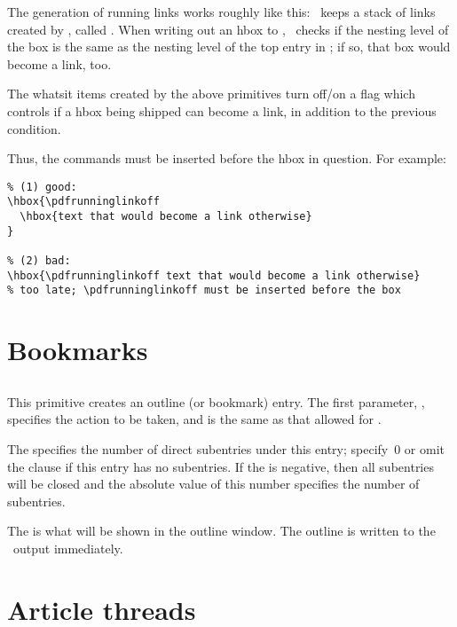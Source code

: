 \documentclass{pdftexmanual}
\begin{document}
The generation of running links works roughly like this: \PDFTEX\ keeps
a stack of links created by , called
. When writing out an hbox to \PDF, \PDFTEX\ checks
if the nesting level of the box is the same as the nesting level of the
top entry in ; if so, that box would become a link,
too.

The whatsit items created by the above primitives turn off/on a flag
which controls if a hbox being shipped can become a link, in addition to
the previous condition.

Thus, the commands must be inserted before the hbox in question. For example:

\begin{verbatim}
% (1) good:
\hbox{\pdfrunninglinkoff
  \hbox{text that would become a link otherwise}
}

% (2) bad:
\hbox{\pdfrunninglinkoff text that would become a link otherwise} 
% too late; \pdfrunninglinkoff must be inserted before the box
\end{verbatim}

\section{Bookmarks}

\subsection{}

This primitive creates an outline (or bookmark) entry. The first
parameter, , specifies the action to be taken, and
is the same as that allowed for \type{\pdfstartlink}.

The   specifies the number of direct
subentries under this entry; specify~0 or omit the clause if this entry
has no subentries. If the  is negative, then all
subentries will be closed and the absolute value of this number
specifies the number of subentries.

The  is what will be shown in the outline
window. The outline is written to the \PDF\ output immediately.

\section{Article threads}
\end{document}
